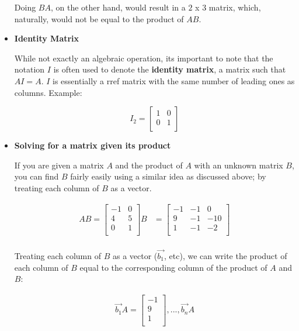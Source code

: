 \documentclass[12pt]{article}
\begin{document}
\begin{itemize}
    Doing $BA$, on the other hand, would result in a $2$ x $3$ matrix, which, naturally, would not be equal to the product of $AB$.
    
    \item \textbf{Identity Matrix}
    
    While not exactly an algebraic operation, its important to note that the notation $I$ is often used to denote the \textbf{identity matrix}, a matrix such that $AI = A$. $I$ is essentially a rref matrix with the same number of leading ones as columns. Example:
    
    \[
    I_{2} = \begin{bmatrix}
    1 & 0\\
    0 & 1\\
    \end{bmatrix}
    \]
    
    \item \textbf{Solving for a matrix given its product}
    
    If you are given a matrix $A$ and the product of $A$ with an unknown matrix $B$, you can find $B$ fairly easily using a similar idea as discussed above; by treating each column of $B$ as a vector.
    
    \begin{equation}
    \begin{split}
        AB = \begin{bmatrix}
        -1 & 0 \\
        4 & 5 \\
        0 & 1\\
        \end{bmatrix}B &= \begin{bmatrix}
        -1 & -1 & 0\\
        9 & -1 & -10\\
        1 & -1 & -2\\
        \end{bmatrix}\\
    \end{split}
    \end{equation}
    
    Treating each column of $B$ as a vector ($\vec{b_1}$, etc), we can write the product of each column of $B$ equal to the corresponding column of the product of $A$ and $B$:
    
    \begin{equation}
    \begin{split}
        \vec{b_1}A = \begin{bmatrix}
        -1\\
        9\\
        1\\
        \end{bmatrix}, ..., \vec{b_n}A
        \end{split}
    \end{equation}
    

\end{itemize}
\end{document}
